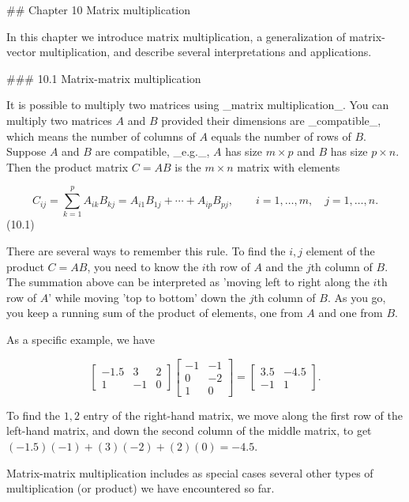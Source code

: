 

## Chapter 10 Matrix multiplication

In this chapter we introduce matrix multiplication, a generalization of matrix-vector multiplication, and describe several interpretations and applications.

### 10.1 Matrix-matrix multiplication

It is possible to multiply two matrices using _matrix multiplication_. You can multiply two matrices \(A\) and \(B\) provided their dimensions are _compatible_, which means the number of columns of \(A\) equals the number of rows of \(B\). Suppose \(A\) and \(B\) are compatible, _e.g._, \(A\) has size \(m\times p\) and \(B\) has size \(p\times n\). Then the product matrix \(C=AB\) is the \(m\times n\) matrix with elements

\[C_{ij}=\sum_{k=1}^{p}A_{ik}B_{kj}=A_{i1}B_{1j}+\cdots+A_{ip}B_{pj},\qquad i=1, \ldots,m,\quad j=1,\ldots,n.\] (10.1)

There are several ways to remember this rule. To find the \(i,j\) element of the product \(C=AB\), you need to know the \(i\)th row of \(A\) and the \(j\)th column of \(B\). The summation above can be interpreted as 'moving left to right along the \(i\)th row of \(A\)' while moving 'top to bottom' down the \(j\)th column of \(B\). As you go, you keep a running sum of the product of elements, one from \(A\) and one from \(B\).

As a specific example, we have

\[\left[\begin{array}{rr}-1.5&3&2\\ 1&-1&0\end{array}\right]\left[\begin{array}{rr}-1&-1\\ 0&-2\\ 1&0\end{array}\right]=\left[\begin{array}{rr}3.5&-4.5\\ -1&1\end{array}\right].\]

To find the \(1,2\) entry of the right-hand matrix, we move along the first row of the left-hand matrix, and down the second column of the middle matrix, to get \((-1.5)(-1)+(3)(-2)+(2)(0)=-4.5\).

Matrix-matrix multiplication includes as special cases several other types of multiplication (or product) we have encountered so far.

